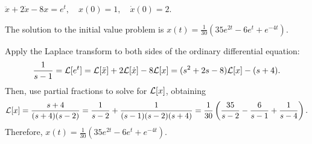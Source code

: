 \documentclass{ximera}
\begin{document}
\begin{exercise} \label{c13.2.2}
$\ddot{x} + 2\dot{x} - 8x = e^t, \quad x(0) = 1, \quad \dot{x}(0) = 2$.

\begin{solution}
\ans The solution to the initial value problem is
$x(t) = \frac{1}{30}(35e^{2t}-6e^t+e^{-4t})$.

\soln Apply the Laplace transform to both sides of the ordinary
differential equation:
\[
\frac{1}{s-1} = {\cal L}[e^t]
= {\cal L}[\ddot{x}] + 2{\cal L}[\dot{x}] - 8{\cal L}[x]
= (s^2 + 2s - 8){\cal L}[x] - (s + 4).
\]
Then, use partial fractions to solve for ${\cal L}[x]$, obtaining
\[
{\cal L}[x] = \frac{s+4}{(s + 4)(s - 2)}
= \frac{1}{s-2} + \frac{1}{(s-1)(s-2)(s+4)}
= \frac{1}{30}\left(\frac{35}{s-2} - \frac{6}{s-1} + \frac{1}{s-4}\right).
\]
Therefore, $x(t)=\frac{1}{30}(35e^{2t}-6e^t+e^{-4t})$.


\end{solution}
\end{exercise}
\end{document}
